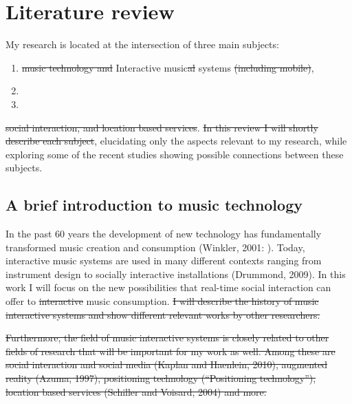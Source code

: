 \section{Literature review}

My research is located at the intersection of three main subjects:
\begin{enumerate}
	\item \st{music technology and} Interactive music\st{al} systems\st{ (including mobile)},
	\item {}
	\item {}
\end{enumerate}
\st{social interaction, and location based services}.  \st{In this review I will shortly describe each subject}, elucidating only the aspects relevant to my research, while exploring some of the recent studies showing possible connections between these subjects. 

\subsection{A brief introduction to music technology}

In the past 60 years the development of new technology has fundamentally transformed music creation and consumption (Winkler, 2001: ). Today, interactive music systems are used in many different contexts ranging from instrument design to socially interactive installations (Drummond, 2009). In this work I will focus on the new possibilities that real-time social interaction can offer to \st{interactive} music consumption. \st{I will describe the history of music interactive systems and show different relevant works by other researchers.} 

\st{Furthermore, the field of music interactive systems is closely related to other fields of research that will be important for my work as well. Among these are social interaction and social media (Kaplan and Haenlein, 2010), augmented reality (Azuma, 1997), positioning technology (``Positioning technology''), location based services (Schiller and Voisard, 2004) and more.}

